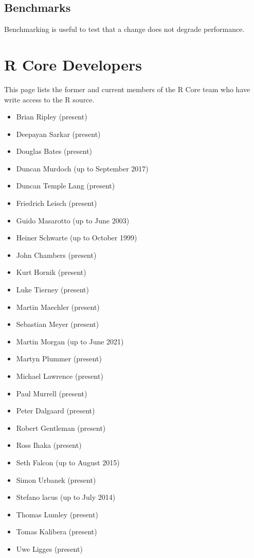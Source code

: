 \documentclass[
]{book}
\providecommand{\tightlist}{%
  \setlength{\itemsep}{0pt}\setlength{\parskip}{0pt}}
\begin{document}
\section{Benchmarks}\label{benchmarks}

Benchmarking is useful to test that a change does not degrade performance.

\chapter{R Core Developers}\label{CoreDev}

This page lists the former and current members of the R Core team who have write access to the R source.

\begin{itemize}
\tightlist
\item
  Brian Ripley (present)
\item
  Deepayan Sarkar (present)
\item
  Douglas Bates (present)
\item
  Duncan Murdoch (up to September 2017)
\item
  Duncan Temple Lang (present)
\item
  Friedrich Leisch (present)
\item
  Guido Masarotto (up to June 2003)
\item
  Heiner Schwarte (up to October 1999)
\item
  John Chambers (present)
\item
  Kurt Hornik (present)
\item
  Luke Tierney (present)
\item
  Martin Maechler (present)
\item
  Sebastian Meyer (present)
\item
  Martin Morgan (up to June 2021)
\item
  Martyn Plummer (present)
\item
  Michael Lawrence (present)
\item
  Paul Murrell (present)
\item
  Peter Dalgaard (present)
\item
  Robert Gentleman (present)
\item
  Ross Ihaka (present)
\item
  Seth Falcon (up to August 2015)
\item
  Simon Urbanek (present)
\item
  Stefano lacus (up to July 2014)
\item
  Thomas Lumley (present)
\item
  Tomas Kalibera (present)
\item
  Uwe Ligges (present)
\end{itemize}
\end{document}
